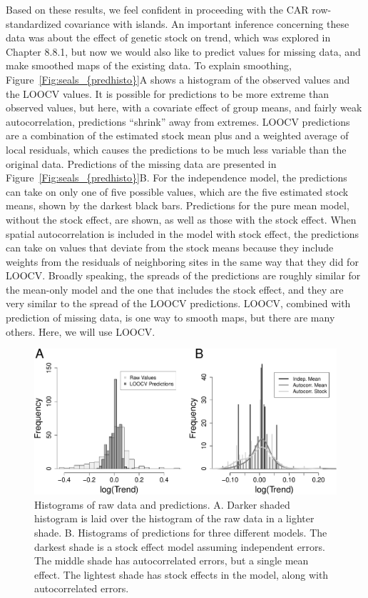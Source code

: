 \documentclass[12pt, titlepage]{article}
\begin{document}
Based on these results, we feel confident in proceeding with the CAR row-standardized covariance with islands.  An important inference concerning these data was about the effect of genetic stock on trend, which was explored in Chapter 8.8.1, but now we would also like to predict values for missing data, and make smoothed maps of the existing data.  To explain smoothing, Figure~\ref{Fig:seals_{predhisto}}A shows a histogram of the observed values and the LOOCV values.  It is possible for predictions to be more extreme than observed values, but here, with a covariate effect of group means, and fairly weak autocorrelation, predictions ``shrink'' away from extremes.  LOOCV predictions are a combination of the estimated stock mean plus and a weighted average of local residuals, which causes the predictions to be much less variable than the original data.  Predictions of the missing data are presented in Figure~\ref{Fig:seals_{predhisto}}B. For the independence model, the predictions can take on only one of five possible values, which are the five estimated stock means, shown by the darkest black bars.  Predictions for the pure mean model, without the stock effect, are shown, as well as those with the stock effect.  When spatial autocorrelation is included in the model with stock effect, the predictions can take on values that deviate from the stock means because they include weights from the residuals of neighboring sites in the same way that they did for LOOCV.  Broadly speaking, the spreads of the predictions are roughly similar for the mean-only model and the one that includes the stock effect, and they are very similar to the spread of the LOOCV predictions.  LOOCV, combined with prediction of missing data, is one way to smooth maps, but there are many others.  Here, we will use LOOCV.
\begin{figure}[H]
  \begin{center}
	    \includegraphics[width=.9\linewidth]{seal_predhist}
  \end{center}
  \caption{Histograms of raw data and predictions. A. Darker shaded histogram is laid over the histogram of the raw data in a lighter shade.  B. Histograms of predictions for three different models.  The darkest shade is a stock effect model assuming independent errors.  The middle shade has autocorrelated errors, but a single mean effect.  The lightest shade has stock effects in the model, along with autocorrelated errors. \label{Fig:seals_predhisto}}
\end{figure}
\end{document}
